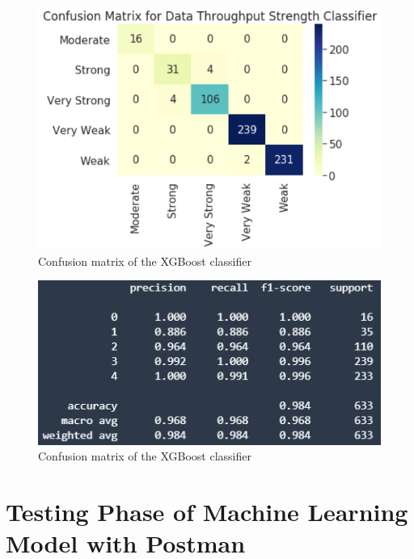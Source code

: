 \begin{figure} [ht]
    \centering
    \includegraphics[scale=1.0]{pages/Chapter 5/Chapter 5 images/cm_xgb6k.PNG}
    \caption{Confusion matrix of the XGBoost classifier}
    \label{fig_crknn}
\end{figure}

\begin{figure} [ht]
    \centering
    \includegraphics[scale=1.3]{pages/Chapter 5/Chapter 5 images/C_report_xgb6k.PNG}
    \caption{Confusion matrix of the XGBoost classifier}
    \label{fig_crknn}
\end{figure}
\section{Testing Phase of Machine Learning Model with Postman}